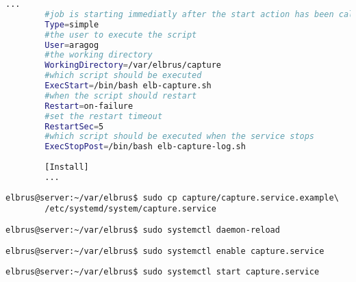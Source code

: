 	\lstset{style=files}
	\begin{lstlisting}[caption={capture.service.example - Die Variable 'WorkingDirectory', Die Variable 'User' sowie die Variable 'ExecStopPost' anpassen.},language=bash ,keywords={WorkingDirectory, User, ExecStopPost}, keywordstyle=\color{red}, firstnumber=3]
		...
		#job is starting immediatly after the start action has been called
		Type=simple
		#the user to execute the script
		User=aragog
		#the working directory
		WorkingDirectory=/var/elbrus/capture
		#which script should be executed
		ExecStart=/bin/bash elb-capture.sh
		#when the script should restart
		Restart=on-failure
		#set the restart timeout
		RestartSec=5
		#which script should be executed when the service stops
		ExecStopPost=/bin/bash elb-capture-log.sh
		
		[Install]
		...
	\end{lstlisting}
	
	\lstset{style=commands}
	\begin{lstlisting}[caption={Kopieren des Serviceprogrammes.}]
		elbrus@server:~/var/elbrus$ sudo cp capture/capture.service.example\
		/etc/systemd/system/capture.service
	\end{lstlisting}
	
	\lstset{style=commands}
	\begin{lstlisting}[caption={Neuladen des 'systemctl' Deamons.}]
		elbrus@server:~/var/elbrus$ sudo systemctl daemon-reload
	\end{lstlisting}
	
	\lstset{style=commands}
	\begin{lstlisting}[caption={Aktivieren des Serviceprogrammes.}]
		elbrus@server:~/var/elbrus$ sudo systemctl enable capture.service
	\end{lstlisting}
	
	\lstset{style=commands}
	\begin{lstlisting}[caption={Starten des Serviceprogrammes.}]
		elbrus@server:~/var/elbrus$ sudo systemctl start capture.service
	\end{lstlisting}